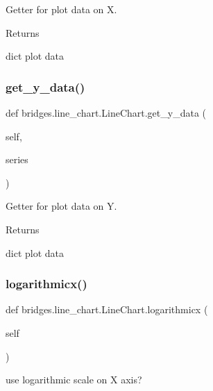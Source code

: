 Getter for plot data on X. 

\begin{DoxyReturn}{Returns}


dict plot data 
\end{DoxyReturn}
\mbox{\label{classbridges_1_1line__chart_1_1_line_chart_ad598554c70b1524eb900b4a66635e367}} 
\subsubsection{\texorpdfstring{get\_y\_data()}{get\_y\_data()}}
{\footnotesize\ttfamily def bridges.\+line\+\_\+chart.\+Line\+Chart.\+get\+\_\+y\+\_\+data (\begin{DoxyParamCaption}\item[{}]{self,  }\item[{}]{series }\end{DoxyParamCaption})}



Getter for plot data on Y. 

\begin{DoxyReturn}{Returns}


dict plot data 
\end{DoxyReturn}
\mbox{\label{classbridges_1_1line__chart_1_1_line_chart_a7f2d2f772e00af6ce08aa40e1efb195c}} 
\subsubsection{\texorpdfstring{logarithmicx()}{logarithmicx()}\hspace{0.1cm}{\footnotesize\ttfamily [1/2]}}
{\footnotesize\ttfamily def bridges.\+line\+\_\+chart.\+Line\+Chart.\+logarithmicx (\begin{DoxyParamCaption}\item[{}]{self }\end{DoxyParamCaption})}



use logarithmic scale on X axis? 

